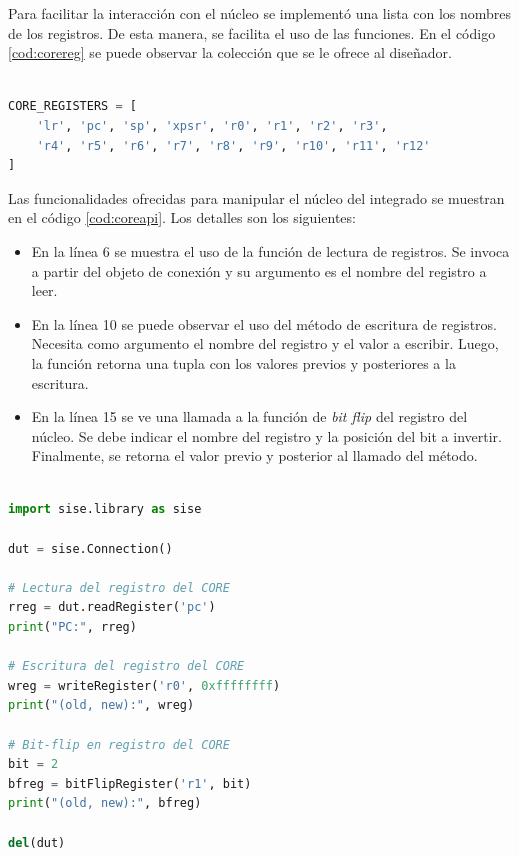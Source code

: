 Para facilitar la interacción con el núcleo se implementó una lista con los nombres de los registros.
De esta manera, se facilita el uso de las funciones.
En el código \ref{cod:corereg} se puede observar la colección que se le ofrece al diseñador.

\begin{lstlisting}[language=Python,label=cod:corereg,caption=Lista de registros accesibles por el usuario.]  % Start your code-block

CORE_REGISTERS = [
    'lr', 'pc', 'sp', 'xpsr', 'r0', 'r1', 'r2', 'r3',
    'r4', 'r5', 'r6', 'r7', 'r8', 'r9', 'r10', 'r11', 'r12'
]

\end{lstlisting}

Las funcionalidades ofrecidas para manipular el núcleo del integrado se muestran en el código \ref{cod:coreapi}.
Los detalles son los siguientes:

\begin{itemize}
    \item En la línea 6 se muestra el uso de la función de lectura de registros.
        Se invoca a partir del objeto de conexión y su argumento es el nombre del registro a leer.
    \item En la línea 10 se puede observar el uso del método de escritura de registros.
        Necesita como argumento el nombre del registro y el valor a escribir.
        Luego, la función retorna una tupla con los valores previos y posteriores a la escritura.
    \item En la línea 15 se ve una llamada a la función de \emph{bit flip} del registro del núcleo.
        Se debe indicar el nombre del registro y la posición del bit a invertir.
        Finalmente, se retorna el valor previo y posterior al llamado del método.
\end{itemize}

\newpage

\begin{lstlisting}[language=Python,label=cod:coreapi,caption=Ejemplo de uso en registros del núcleo.]  % Start your code-block

import sise.library as sise

dut = sise.Connection()

# Lectura del registro del CORE
rreg = dut.readRegister('pc')
print("PC:", rreg)

# Escritura del registro del CORE
wreg = writeRegister('r0', 0xffffffff)
print("(old, new):", wreg)

# Bit-flip en registro del CORE
bit = 2
bfreg = bitFlipRegister('r1', bit)
print("(old, new):", bfreg)

del(dut)

\end{lstlisting}

